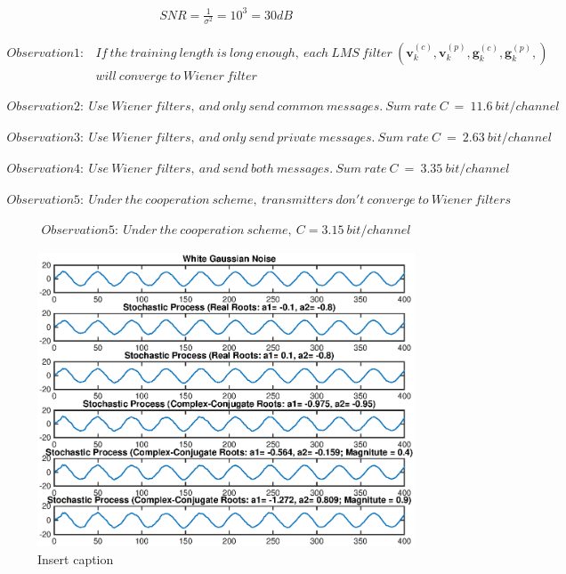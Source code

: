 \documentclass[11pt, oneside]{article}   	%
\begin{document}
\begin{align*}
SNR = \frac {1}{\sigma^2} = 10^3=30dB
\end{align*}

\begin{align*}
Observation1: &If\ the\ training\ length\ is\ long\ enough,\ each\ LMS\ filter\ (\textbf{v}^{(c)}_{k},\textbf{v}^{(p)}_{k},\textbf{g}^{(c)}_{k},\textbf{g}^{(p)}_{k},)\\
&will\ converge\ to\ Wiener\ filter
\end{align*}

\begin{align*}
Observation2:\ Use\ Wiener\ filters,\ and\ only\ send\ common\ messages.\ Sum\ rate\ C\ =\ 11.6\ bit/channel
\end{align*}

\begin{align*}
Observation3:\ Use\ Wiener\ filters,\ and\ only\ send\ private\ messages.\ Sum\ rate\ C\ =\ 2.63\ bit/channel
\end{align*}

\begin{align*}
Observation4:\ Use\ Wiener\ filters,\ and\  send\ both\ messages.\ Sum\ rate\ C\ =\ 3.35\ bit/channel
\end{align*}

\begin{align*}
Observation5:\ Under\ the\ cooperation\ scheme,\ transmitters\ don't\ converge\ to\ Wiener\ filters 
\end{align*}

\begin{align*}
Observation5:\ Under\ the\ cooperation\ scheme,\ C=3.15\ bit/channel
\end{align*}



\begin{figure}[bp!]
    \centering
    \includegraphics[width=150mm]{01}
    \caption{Insert caption}
\end{figure} 



 
\end{document}
